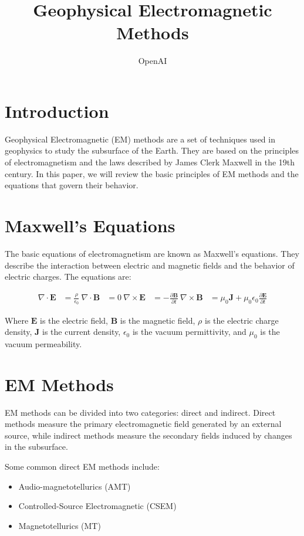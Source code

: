 \documentclass{article}
\title{Geophysical Electromagnetic Methods}
\author{OpenAI}
\date{}
\begin{document}
\maketitle

\section{Introduction}
Geophysical Electromagnetic (EM) methods are a set of techniques used in geophysics to study the subsurface of the Earth. They are based on the principles of electromagnetism and the laws described by James Clerk Maxwell in the 19th century. In this paper, we will review the basic principles of EM methods and the equations that govern their behavior.

\section{Maxwell's Equations}
The basic equations of electromagnetism are known as Maxwell's equations. They describe the interaction between electric and magnetic fields and the behavior of electric charges. The equations are:

\begin{align}
\nabla \cdot \mathbf{E} &= \frac{\rho}{\epsilon_0} \
\nabla \cdot \mathbf{B} &= 0 \
\nabla \times \mathbf{E} &= -\frac{\partial \mathbf{B}}{\partial t} \
\nabla \times \mathbf{B} &= \mu_0 \mathbf{J} + \mu_0 \epsilon_0 \frac{\partial \mathbf{E}}{\partial t}
\end{align}

Where $\mathbf{E}$ is the electric field, $\mathbf{B}$ is the magnetic field, $\rho$ is the electric charge density, $\mathbf{J}$ is the current density, $\epsilon_0$ is the vacuum permittivity, and $\mu_0$ is the vacuum permeability.

\section{EM Methods}
EM methods can be divided into two categories: direct and indirect. Direct methods measure the primary electromagnetic field generated by an external source, while indirect methods measure the secondary fields induced by changes in the subsurface.

Some common direct EM methods include:
\begin{itemize}
\item Audio-magnetotellurics (AMT)
\item Controlled-Source Electromagnetic (CSEM)
\item Magnetotellurics (MT)
\end{itemize}
\end{document}

